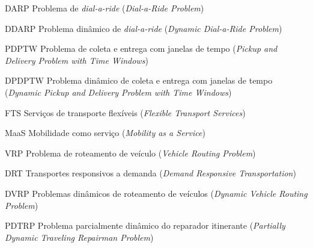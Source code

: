 


\begin{siglas}
    \item[DARP]   Problema de \textit{dial-a-ride} 
                  (\textit{Dial-a-Ride Problem})
    \item[DDARP]  Problema dinâmico de \textit{dial-a-ride}
                  (\textit{Dynamic Dial-a-Ride Problem})
    \item[PDPTW]  Problema de coleta e entrega com janelas de tempo 
                  (\textit{Pickup and Delivery Problem with Time Windows})
    \item[DPDPTW] Problema dinâmico de coleta e entrega com janelas de tempo
                  (\textit{Dynamic Pickup and Delivery Problem with Time 
                  Windows})
    \item[FTS]    Serviços de transporte flexíveis
                  (\textit{Flexible Transport Services})
    \item[MaaS]   Mobilidade como serviço
                  (\textit{Mobility as a Service})
    \item[VRP]    Problema de roteamento de veículo 
                  (\textit{Vehicle Routing Problem})
    \item[DRT]    Transportes responsivos a demanda 
                  (\textit{Demand Responsive Transportation})
    \item[DVRP]   Problemas dinâmicos de roteamento de veículos
                  (\textit{Dynamic Vehicle Routing Problem})
    \item[PDTRP]  Problema parcialmente dinâmico do reparador itinerante
                  (\textit{Partially Dynamic Traveling Repairman Problem})
\end{siglas}

